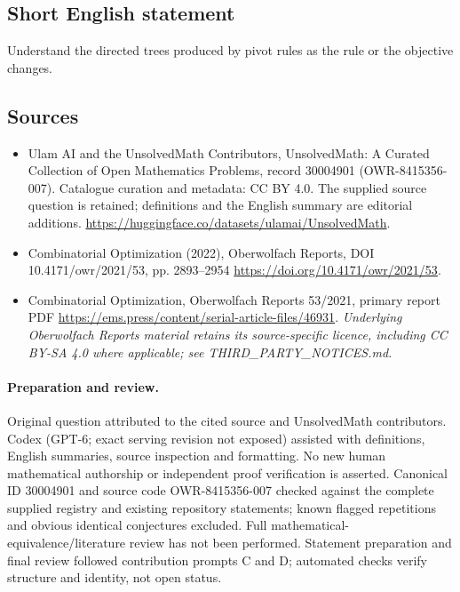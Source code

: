 \documentclass[11pt]{article}
\begin{document}
\subsection{Short English statement}
Understand the directed trees produced by pivot rules as the rule or the objective changes.
\subsection{Sources}
\begin{itemize}
\item[\hypertarget{source:30004901:1}{S1}] Ulam AI and the UnsolvedMath Contributors, UnsolvedMath: A Curated Collection of Open Mathematics Problems, record 30004901 (OWR-8415356-007). Catalogue curation and metadata: CC BY 4.0. The supplied source question is retained; definitions and the English summary are editorial additions.
\url{https://huggingface.co/datasets/ulamai/UnsolvedMath}.
\item[\hypertarget{source:30004901:2}{S2}] Combinatorial Optimization (2022), Oberwolfach Reports, DOI 10.4171/owr/2021/53, pp. 2893--2954
\url{https://doi.org/10.4171/owr/2021/53}.
\item[\hypertarget{source:30004901:3}{S3}] Combinatorial Optimization, Oberwolfach Reports 53/2021, primary report PDF
\url{https://ems.press/content/serial-article-files/46931}.
\textit{Underlying Oberwolfach Reports material retains its source-specific licence, including CC BY-SA 4.0 where applicable; see THIRD\_PARTY\_NOTICES.md.}
\end{itemize}
\paragraph{Preparation and review.}
Original question attributed to the cited source and UnsolvedMath contributors. Codex (GPT-6; exact serving revision not exposed) assisted with definitions, English summaries, source inspection and formatting. No new human mathematical authorship or independent proof verification is asserted. Canonical ID 30004901 and source code OWR-8415356-007 checked against the complete supplied registry and existing repository statements; known flagged repetitions and obvious identical conjectures excluded. Full mathematical-equivalence/literature review has not been performed. Statement preparation and final review followed contribution prompts C and D; automated checks verify structure and identity, not open status.
\label{end:30004901}
\end{document}
